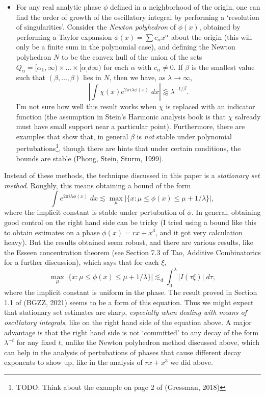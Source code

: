 \begin{itemize}
		\item For any real analytic phase $\phi$ defined in a neighborhood of the origin, one can find the order of growth of the oscillatory integral by performing a `resolution of singularities'. Consider the \emph{Newton polyhedron} of $\phi(x)$, obtained by performing a Taylor expansion $\phi(x) = \sum c_\alpha x^\alpha$ about the origin (this will only be a finite sum in the polynomial case), and defining the Newton polyhedron $N$ to be the convex hull of the union of the sets $Q_\alpha = [\alpha_1, \infty) \times \dots \times [\alpha_,d \infty)$ for each $\alpha$ with $c_\alpha \neq 0$. If $\beta$ is the smallest value such that $(\beta,\dots,\beta)$ lies in $N$, then we have, as $\lambda \to \infty$,
		\[ \left| \int \chi(x) e^{2 \pi i \lambda \phi(x)}\; dx \right| \lessapprox \lambda^{-1/\beta}. \]
		I'm not sure how well this result works when $\chi$ is replaced with an indicator function (the assumption in Stein's Harmonic analysis book is that $\chi$ salready must have small support near a particular point). Furthermore, there are examples that show that, in general $\beta$ is \emph{not} stable under polynomial pertubations\footnote{TODO: Think about the example on page 2 of (Gressman, 2018)}, though there are hints that under certain conditions, the bounds are stable (Phong, Stein, Sturm, 1999).
	\end{itemize}
	Instead of these methods, the technique discussed in this paper is a \emph{stationary set method}. Roughly, this means obtaining a bound of the form
	\[ \int e^{2 \pi i \lambda \phi(x)}\; dx \lesssim \max_{\mu} \Big| \{ x : \mu \leq \phi(x) \leq \mu + 1/\lambda \} \Big|, \]
	where the implicit constant is stable under pertubation of $\phi$. In general, obtaining good control on the right hand side can be tricky (I tried using a bound like this to obtain estimates on a phase $\phi(x) = rx + x^3$, and it got very calculation heavy). But the results obtained seem robust, and there are various results, like the Esseen concentration theorem (see Section 7.3 of Tao, Additive Combinatorics for a further discussion), which says that for each $\xi$,
	\[ \max_\mu \Big| \{ x : \mu \leq \phi(x) \leq \mu + 1/\lambda \} \Big| \lesssim_d \int_0^{\lambda} |I(\tau \xi)|\; d\tau, \]
	where the implicit constant is uniform in the phase. The result proved in Section 1.1 of (BGZZ, 2021) seems to be a form of this equation. Thus we might expect that stationary set estimates are sharp, \emph{especially when dealing with means of oscillatory integrals}, like on the right hand side of the equation above. A major advantage is that the right hand side is not `committed' to any decay of the form $\lambda^{-t}$ for any fixed $t$, unlike the Newton polyhedron method discussed above, which can help in the analysis of pertubations of phases that cause different decay exponents to show up, like in the analysis of $rx + x^3$ we did above.

